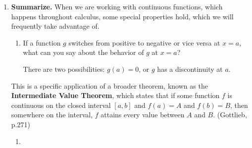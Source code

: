 \documentclass[main]{subfiles}
\begin{document}
\begin{enumerate}[resume]
\begin{enumerate}
    \begin{solution}
      If we get rid of the requirement that the function is continuous, then it's possible:
      \begin{center}
      \end{center}
    \end{solution}

  \end{enumerate}

\item  \textbf{Summarize.} When we are working with continuous functions, which happens throughout calculus, some special properties hold, which we will frequently take advantage of. 

  \begin{enumerate}
  \item

    \begin{problem}[0.5in]
      If a function $g$ switches from positive to negative or vice versa at $x = a$, what can you say about the behavior of $g$ at $x = a$?
    \end{problem}

    \begin{solution}
      There are two possibilities: $g(a) = 0$, or $g$ has a discontinuity at $a$.
    \end{solution}
\end{enumerate}
\begin{framed}
    This is a specific application of a broader theorem, known as the \textbf{Intermediate Value Theorem}, which states that if some function $f$ is continuous on the closed interval $[a, b]$ and $f(a) = A$ and $f(b)=B$, then somewhere on the interval, $f$ attains every value between $A$ and $B$. (Gottlieb, p.271)
\end{framed}
\begin{enumerate}[resume]
  \item

\end{enumerate}
\end{enumerate}
\end{document}
